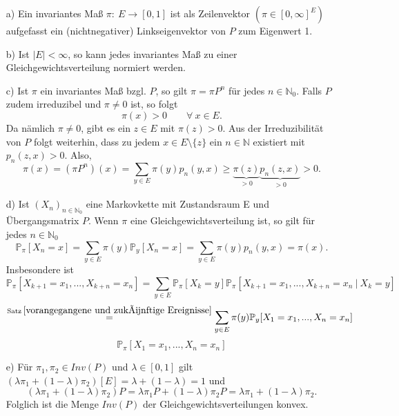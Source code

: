 
\label{Auflistende Bemerkung zu invarianten Maßen}
\mbox{}
\begin{itemize}
\item[a)] Ein invariantes Maß $\pi : \: E \to [0,1]$ ist als Zeilenvektor $(\pi \in [0,\infty]^{E})$ aufgefasst ein (nichtnegativer) Linkseigenvektor von $P$ zum Eigenwert 1.
\item[b)] Ist $\vert E \vert < \infty$, so kann jedes invariantes Maß zu einer Gleichgewichtsverteilung normiert werden.
\item[c)] Ist $\pi$ ein invariantes Maß bzgl. $P$, so gilt $\pi = \pi P^{n}$ für jedes $n \in \mathbb{N}_{0}$. Falls $P$ zudem irreduzibel und $\pi \neq 0$ ist, so folgt
\begin{equation*}
\pi(x) > 0 \qquad \forall \: x \in E.
\end{equation*}
Da nämlich $\pi \neq 0$, gibt es ein $z \in E$ mit $\pi (z) > 0$. Aus der Irreduzibilität von $P$ folgt weiterhin, dass zu jedem $x \in E \setminus \lbrace z \rbrace$ ein $n \in \mathbb{N}$ existiert mit $p_{n}(z,x)>0$. Also,
\begin{equation*}
\pi (x) = (\pi P^{n})(x) = \sum_{y \in E} \pi (y) p_{n} (y,x) \geq
\underbrace{\pi (z)}_{>0} \underbrace{ p_{n} (z,x)}_{>0} > 0.
\end{equation*} 
\item[d)] Ist $(X_{n})_{n \in \mathbb{N}_{0}}$ eine Markovkette mit Zustandsraum E und Übergangsmatrix $P$. Wenn $\pi$ eine Gleichgewichtsverteilung ist, so gilt für jedes $n \in \mathbb{N}_{0}$
\begin{equation*}
\mathbb{P}_{\pi}[X_{n} = x] = \sum_{y \in E} \pi (y) \mathbb{P}_{y}[X_{n} = x] = \sum_{y \in E} \pi (y) p_{n}(y,x) = \pi (x).  
\end{equation*}
Insbesondere ist
\begin{equation*}
\mathbb{P}_{\pi} [X_{k+1} = x_{1},...,X_{k+n} = x_{n}] = \sum_{y \in E} \mathbb{P}_{\pi} [X_{k} = y] \mathbb{P}_{\pi} [X_{k+1} = x_{1},...,X_{k+n} = x_{n} \: | \: X_{k} = y]
\end{equation*}
\begin{equation*}
\stackrel{\mathrm{Satz} \: \ref{vorangegangene und zukünftige Ereignisse}}{=} \sum_{y \in E} \pi (y)  \mathbb{P}_{y} [X_{1} = x_{1},...,X_{n} = x_{n}]
\end{equation*}
\begin{equation*}
\mathbb{P}_{\pi} [X_{1} = x_{1},...,X_{n} = x_{n}]
\end{equation*}
\item[e)] Für $\pi_{1}, \pi_{2} \in Inv(P)$ und $\lambda \in [0,1]$ gilt $(\lambda \pi_{1} + (1- \lambda) \pi_{2})[E] = \lambda + (1-\lambda)=1$ und
\begin{equation*}
(\lambda \pi_{1} + (1- \lambda) \pi_{2})P = \lambda \pi_{1}P + (1- \lambda) \pi_{2}P = \lambda \pi_{1} + (1- \lambda) \pi_{2}.
\end{equation*}
Folglich ist die Menge $Inv(P)$ der Gleichgewichtsverteilungen konvex.
\end{itemize}